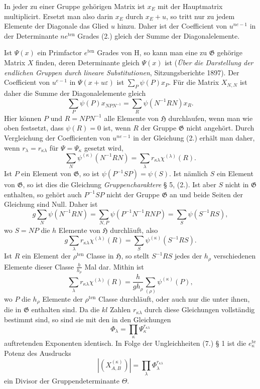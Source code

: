 \documentclass[11pt]{article}
\newcommand{\Hgr}{\mathfrak{H}}
\newcommand{\Ggr}{\mathfrak{G}}
\begin{document}
In jeder zu einer Gruppe gehörigen Matrix ist $x_E$ mit der Hauptmatrix multiplicirt. Ersetzt man also darin $x_E$ durch $x_E+u$, so tritt nur zu jedem Elemente der Diagonale das Glied $u$ hinzu. Daher ist der Coefficient von $u^{ne-1}$ in der Determinante $ne^{\mathrm{ten}}$ Grades (2.) gleich der Summe der Diagonalelemente.

Ist $\Psi(x)$ ein Primfactor $e^{\mathrm{ten}}$ Grades von $\mathrm H$, so kann man eine zu $\Ggr$ gehörige Matrix $X$ finden, deren Determinante gleich $\Psi(x)$ ist (\emph{Über die Darstellung der endlichen Gruppen durch lineare Substitutionen}, Sitzungsberichte 1897). Der Coefficient von $u^{e-1}$ in $\Psi(x+u\varepsilon)$ ist $\sum_P\psi(P)x_P$. Für die Matrix $X_{N,N}$ ist daher die Summe der Diagonalelemente gleich
\[
  \sum_P\psi(P)x_{NPN^{-1}}
  =
  \sum_R\psi(N^{-1}RN)x_R.
\]
Hier können $P$ und $R=NPN^{-1}$ alle Elemente von $\Hgr$ durchlaufen, wenn man wie oben festsetzt, dass $\psi(R)=0$ ist, wenn $R$ der Gruppe $\Ggr$ nicht angehört. Durch Vergleichung der Coefficienten von $u^{ne-1}$ in der Gleichung (2.) erhält man daher, wenn $r_\lambda=r_{\kappa\lambda}$ für $\Psi=\Psi_\kappa$ gesetzt wird,
\[
\tag{3.}
  \sum_N\psi^{(\kappa)}(N^{-1}RN)
  =
  \sum_\lambda r_{\kappa\lambda}\chi^{(\lambda)}(R).
\]
Ist $P$ ein Element von $\Ggr$, so ist $\psi(P^{-1}SP)=\psi(S)$. Ist nämlich $S$ ein Element von $\Ggr$, so ist dies die Gleichung \emph{Gruppencharaktere} § 5, (2.). Ist aber $S$ nicht in $\Ggr$ enthalten, so gehört auch $P^{-1}SP$ nicht der Gruppe $\Ggr$ an und beide Seiten der Gleichung sind Null. Daher ist
\[
  g\sum_N\psi(N^{-1}RN)
  =
  \sum_{N,P}\psi(P^{-1}N^{-1}RNP)
  =
  \sum_S\psi(S^{-1}RS),
\]
wo $S=NP$ die $h$ Elemente von $\Hgr$ durchläuft, also
\[
\tag{4.}
  g\sum_\lambda r_{\kappa\lambda}\chi^{(\lambda)}(R)
  =
  \sum_S\psi^{(\kappa)}(S^{-1}RS).
\]
Ist $R$ ein Element der $\rho^{\mathrm{ten}}$ Classe in $\Hgr$, so stellt $S^{-1}RS$ jedes der $h_\rho$ verschiedenen Elemente dieser Classe $\frac{h}{h_\rho}$ Mal dar. Mithin ist
\[
\tag{5.}
  \sum_\lambda r_{\kappa\lambda}\chi^{(\lambda)}(R)
  =
  \frac{h}{g h_\rho}\sum_{(\rho)}\psi^{(\kappa)}(P),
\]
wo $P$ die $h_\rho$ Elemente der $\rho^{\mathrm{ten}}$ Classe durchläuft, oder auch nur die unter ihnen, die in $\Ggr$ enthalten sind. Da die $kl$ Zahlen $r_{\kappa\lambda}$ durch diese Gleichungen vollständig bestimmt sind, so sind sie mit den in den Gleichungen
\[
\tag{6.}
  \Phi_\lambda=\prod_\kappa\Psi_\kappa^{r_{\kappa\lambda}}
\]
auftretenden Exponenten identisch. In Folge der Ungleichheiten (7.) § 1 ist die $e_\kappa^{\mathrm{te}}$ Potenz des Ausdrucks
\[
\tag{7.}
  |(X^{(\kappa)}_{A,B})|=\prod_\lambda\Phi_\lambda^{r_{\kappa\lambda}}
\]
ein Divisor der Gruppendeterminante $\Theta$.
\end{document}
